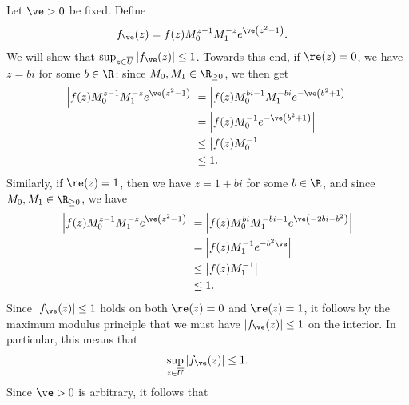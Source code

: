 \documentclass[10pt]{mypackage}
\begin{document}
\begin{solution}
  Let $\ve > 0$ be fixed. Define
  \begin{align*}
    f_{\ve}(z) &= f(z) M_0^{z-1}M_1^{-z}e^{\ve\left( z^2 - 1 \right)}.
  \end{align*}
  We will show that $\sup_{z\in \overline{U}}\left\vert f_{\ve}(z) \right\vert \leq 1$. Towards this end, if $\re(z) = 0$, we have $z = bi$ for some $b \in \R$; since $M_0,M_1\in \R_{\geq 0}$, we then get
  \begin{align*}
    \left\vert f(z)M_0^{z-1}M_1^{-z}e^{\ve \left( z^2 - 1 \right)} \right\vert &= \left\vert f(z)M_0^{bi-1}M_1^{-bi}e^{-\ve\left( b^2 + 1 \right)} \right\vert\\
                                                                               &= \left\vert f(z)M_0^{-1}e^{-\ve\left( b^2 + 1 \right)} \right\vert\\
                                                                               &\leq \left\vert f(z)M_0^{-1} \right\vert\\
                                                                               &\leq 1.
  \end{align*}
  Similarly, if $\re(z) = 1$, then we have $z = 1 + bi$ for some $b\in \R$, and since $M_0,M_1\in \R_{\geq 0}$, we have
  \begin{align*}
    \left\vert f(z) M_0^{z-1}M_1^{-z}e^{\ve\left( z^2 - 1 \right)} \right\vert &= \left\vert f(z) M_0^{bi}M_1^{-bi-1}e^{\ve\left( -2bi-b^2 \right)} \right\vert\\
                                                                               &= \left\vert f(z)M_1^{-1}e^{-b^2\ve} \right\vert\\
                                                                               &\leq \left\vert f(z)M_1^{-1} \right\vert\\
                                                                               &\leq 1.
  \end{align*}
  Since $\left\vert f_{\ve}(z) \right\vert \leq 1$ holds on both $\re(z) = 0$ and $\re(z) = 1$, it follows by the maximum modulus principle that we must have $\left\vert f_{\ve}(z) \right\vert \leq 1$ on the interior. In particular, this means that
  \begin{align*}
    \sup_{z\in \overline{U}} \left\vert f_{\ve}(z) \right\vert \leq 1.
  \end{align*}
  Since $\ve > 0$ is arbitrary, it follows that
  \begin{align*}

\end{align*}
\end{solution}
\end{document}
